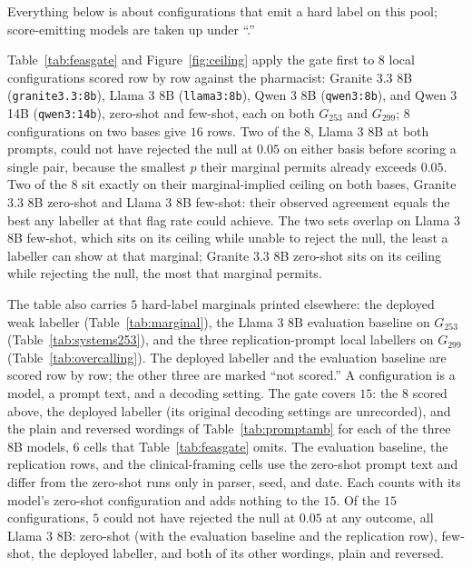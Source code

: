 Everything below is about configurations that emit a hard label on this pool; score-emitting
models are taken up under ``.''

Table~\ref{tab:feasgate} and Figure~\ref{fig:ceiling} apply the gate first to
$8$ local configurations scored row by row against the pharmacist:
Granite 3.3 8B (\texttt{granite3.3:8b}), Llama 3 8B (\texttt{llama3:8b}), Qwen 3 8B (\texttt{qwen3:8b}), and Qwen 3 14B (\texttt{qwen3:14b}), zero-shot and few-shot, each on
both $G_{253}$ and $G_{299}$; $8$ configurations on two bases give $16$
rows. Two of the $8$,
Llama 3 8B at both prompts, could not have rejected the null at
$0.05$ on either basis before scoring a single pair, because the smallest $p$
their marginal permits already exceeds $0.05$. Two of the $8$ sit
exactly on their marginal-implied ceiling on both bases,
Granite 3.3 8B zero-shot and Llama 3 8B few-shot: their
observed agreement equals the best any labeller at that flag rate could achieve. The two
sets overlap on Llama 3 8B few-shot, which sits on
its ceiling while unable to reject the null, the least a labeller can show at
that marginal; Granite 3.3 8B zero-shot sits on its ceiling while
rejecting the null, the most that marginal permits.

The table also carries $5$ hard-label marginals printed elsewhere: the deployed weak labeller (Table~\ref{tab:marginal}),
the Llama 3 8B evaluation baseline on $G_{253}$ (Table~\ref{tab:systems253}),
and the three replication-prompt local labellers on $G_{299}$
(Table~\ref{tab:overcalling}). The deployed labeller and the evaluation
baseline are scored row by row; the other three are marked ``not scored.'' A configuration
is a model, a prompt text, and a decoding setting. The gate covers $15$: the $8$ scored above,
the deployed labeller (its original decoding settings are unrecorded), and the plain and reversed
wordings of Table~\ref{tab:promptamb} for each of the three 8B models, $6$ cells that
Table~\ref{tab:feasgate} omits. The evaluation baseline, the replication rows, and the
clinical-framing cells use the zero-shot prompt text and differ from the zero-shot runs only in
parser, seed, and date. Each counts with its model's zero-shot configuration and adds nothing to
the $15$. Of the $15$ configurations, $5$ could not have rejected the null at $0.05$ at any outcome, all
Llama 3 8B: zero-shot (with the evaluation baseline and the replication row), few-shot, the
deployed labeller, and both of its other wordings, plain and reversed. 

